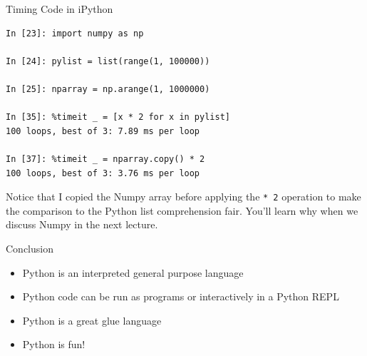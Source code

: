 \documentclass[smaller, aspectratio=1610]{beamer}
\begin{document}
\begin{frame}[label={sec:org73e1e70},fragile]{Timing Code in iPython}
 \lstset{language=sh,label= ,caption= ,captionpos=b,numbers=none}
\begin{lstlisting}
In [23]: import numpy as np

In [24]: pylist = list(range(1, 100000))

In [25]: nparray = np.arange(1, 1000000)

In [35]: %timeit _ = [x * 2 for x in pylist]
100 loops, best of 3: 7.89 ms per loop

In [37]: %timeit _ = nparray.copy() * 2
100 loops, best of 3: 3.76 ms per loop
\end{lstlisting}

Notice that I copied the Numpy array before applying the \texttt{* 2} operation to make the comparison to the Python list comprehension fair. You'll learn why when we discuss Numpy in the next lecture.
\end{frame}


\begin{frame}[label={sec:orgdb4a4d8}]{Conclusion}
\begin{itemize}
\item Python is an interpreted general purpose language

\item Python code can be run as programs or interactively in a Python REPL

\item Python is a great glue language

\item Python is fun!
\end{itemize}
\end{frame}
\end{document}
